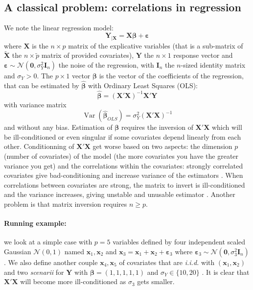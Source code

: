 \documentclass[11pt,a4paper]{article}
\begin{document}
\subsection{A classical problem: correlations in regression}\label{sectionOLS}
We note the linear regression model:
\begin{equation}
		\boldsymbol{Y}_{|\boldsymbol{X}}=\boldsymbol{X}\boldsymbol{\beta} + \boldsymbol{\varepsilon} \label{regressionsimple}
	\end{equation}
	where $\boldsymbol{X}$ is the $n\times p$ matrix of the explicative variables (that is a sub-matrix of $\tilde{\boldsymbol{X}}$ the $n\times \tilde{p}$ matrix of provided covariates), $\boldsymbol{Y}$ the  $n\times 1$ response vector and $\boldsymbol{\varepsilon} \sim \mathcal{N}(\boldsymbol{0},\sigma_Y^2\boldsymbol{I}_n)$ the noise of the regression, with $\boldsymbol{I}_n$ the $n$-sized identity matrix and $\sigma_Y >0$. The $p\times 1$ vector $\boldsymbol{\beta}$ is the vector of the coefficients of the regression, that can be estimated by $\hat{\boldsymbol{\beta}}$ with Ordinary Least Squares (\textsc{OLS}): %
	\begin{equation}
		\boldsymbol{\hat{\beta}}=\left(\boldsymbol{X}'\boldsymbol{X} \right) ^{-1}\boldsymbol{X}'\boldsymbol{Y}
	\end{equation}
	with variance matrix
	\begin{equation}
		\operatorname{Var}(\hat{\boldsymbol{\beta}}_{OLS})=\sigma_Y^2\left(\boldsymbol{X}'\boldsymbol{X} \right) ^{-1} \label{eqOLS}
	\end{equation}
	and without any bias.
	Estimation of $\boldsymbol{\beta}$ requires the inversion of $\boldsymbol{X}'\boldsymbol{X}$ which will be ill-conditioned or even singular if some covariates depend linearly from each other. 
Conditionning of $\boldsymbol{X}'\boldsymbol{X}$ get worse based on two aspects: the dimension $p$ (number of covariates) of the model (the more covariates you have the greater variance you get)
	 and the correlations within the covariates: strongly correlated covariates give bad-conditioning and increase variance of the estimators .
	When correlations between covariates are strong, the matrix to invert is ill-conditioned and the variance increases, giving unstable and unusable estimator \cite{hoerl1970ridge}.
	Another problem is that matrix inversion requires $n\geq p$. 	
\paragraph{Running example:} we look at a simple case with $p=5$ variables defined by four independent scaled Gaussian $\mathcal{N}(0,1)$ named $\boldsymbol{x}_1,\boldsymbol{x}_2$ and $\boldsymbol{x}_3=\boldsymbol{x}_1+\boldsymbol{x}_2+\boldsymbol{\varepsilon}_3$ where $\boldsymbol{\varepsilon}_3\sim{\mathcal{N}(\boldsymbol{0},\sigma_3^2\boldsymbol{I}_n)}$. We also define another couple $\boldsymbol{x}_4,\boldsymbol{x}_5$ of covariates that are {\it i.i.d. } with $(\boldsymbol{x}_1,\boldsymbol{x}_2)$ and two {\it scenarii} for $\boldsymbol{Y}$ with $\boldsymbol{\beta}=(1,1,1,1,1)$ and $\sigma_Y \in \{10,20\}$ .
It is clear that $\boldsymbol{X}'\boldsymbol{X}$ will become more ill-conditioned as $\sigma_3$ gets smaller.
	
\end{document}

